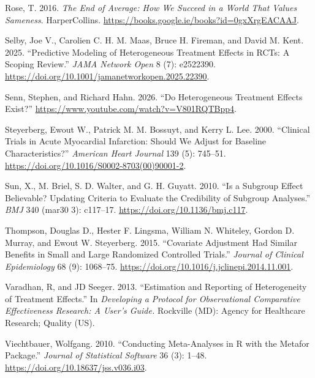 \documentclass{article}
\newlength{\cslhangindent}
\newenvironment{CSLReferences}[2] %
 {\begin{list}{}{%
  \setlength{\itemindent}{0pt}
  \setlength{\leftmargin}{0pt}
  \setlength{\parsep}{0pt}
  \ifodd #1
   \setlength{\leftmargin}{\cslhangindent}
   \setlength{\itemindent}{-1\cslhangindent}
  \fi
  \setlength{\itemsep}{#2\baselineskip}}}
 {\end{list}}
\begin{document}
\begin{CSLReferences}{1}{0}
Rose, T. 2016. \emph{The {End} of {Average}: {How} {We} {Succeed} in a
{World} {That} {Values} {Sameness}}. HarperCollins.
\url{https://books.google.ie/books?id=0gxXrgEACAAJ}.

Selby, Joe V., Carolien C. H. M. Maas, Bruce H. Fireman, and David M.
Kent. 2025. {``Predictive {Modeling} of {Heterogeneous} {Treatment}
{Effects} in {RCTs}: {A} {Scoping} {Review}.''} \emph{JAMA Network Open}
8 (7): e2522390.
\url{https://doi.org/10.1001/jamanetworkopen.2025.22390}.

Senn, Stephen, and Richard Hahn. 2026. {``Do {Heterogeneous} {Treatment}
{Effects} {Exist}?''} \url{https://www.youtube.com/watch?v=V801RQTBpp4}.

Steyerberg, Ewout W., Patrick M. M. Bossuyt, and Kerry L. Lee. 2000.
{``Clinical Trials in Acute Myocardial Infarction: {Should} We Adjust
for Baseline Characteristics?''} \emph{American Heart Journal} 139 (5):
745--51. \url{https://doi.org/10.1016/S0002-8703(00)90001-2}.

Sun, X., M. Briel, S. D. Walter, and G. H. Guyatt. 2010. {``Is a
Subgroup Effect Believable? {Updating} Criteria to Evaluate the
Credibility of Subgroup Analyses.''} \emph{BMJ} 340 (mar30 3): c117--17.
\url{https://doi.org/10.1136/bmj.c117}.

Thompson, Douglas D., Hester F. Lingsma, William N. Whiteley, Gordon D.
Murray, and Ewout W. Steyerberg. 2015. {``Covariate Adjustment Had
Similar Benefits in Small and Large Randomized Controlled Trials.''}
\emph{Journal of Clinical Epidemiology} 68 (9): 1068--75.
\url{https://doi.org/10.1016/j.jclinepi.2014.11.001}.

Varadhan, R, and JD Seeger. 2013. {``Estimation and {Reporting} of
{Heterogeneity} of {Treatment} {Effects}.''} In \emph{Developing a
{Protocol} for {Observational} {Comparative} {Effectiveness} {Research}:
{A} {User}'s {Guide}.} Rockville (MD): Agency for Healthcare Research;
Quality (US).

Viechtbauer, Wolfgang. 2010. {``Conducting Meta-Analyses in {R} with the
Metafor Package.''} \emph{Journal of Statistical Software} 36 (3):
1--48. \url{https://doi.org/10.18637/jss.v036.i03}.


\end{CSLReferences}
\end{document}
